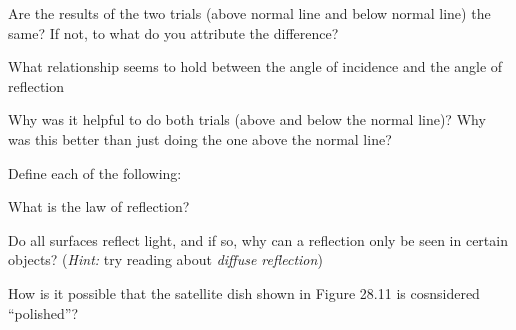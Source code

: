 \documentclass[10pt]{exam}
\begin{document}
\begin{questions}


  \question
    Are the results of the two trials (above normal line and below normal line) the same?  If not, to what do you attribute the difference? \vs[2] 

  \question
    What relationship seems to hold between the angle of incidence and the angle of reflection \vs[2] 

  \question
    Why was it helpful to do both trials (above and below the normal line)?  Why was this better than just doing the one above the normal line? \vs[2] 


    \question
      Define each of the following:

    
    \question
      What is the law of reflection? \vs[2]
    
    
    \question
      Do all surfaces reflect light, and if so, why can a reflection only be seen in certain objects? (\emph{Hint:} try reading about \emph{diffuse reflection}) \vs[2]
    
    \question
      How is it possible that the satellite dish shown in Figure 28.11 is cosnsidered ``polished''? \vs[2]

\end{questions}
\end{document}
